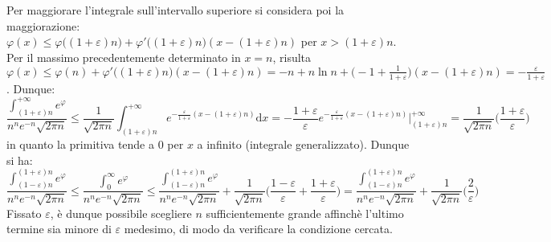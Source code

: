 \documentclass[10pt]{article}
\theoremstyle{plain}
\begin{document}
Per maggiorare l'integrale sull'intervallo superiore si considera poi la maggiorazione: 
\\$\displaystyle \varphi(x) \leq \varphi\big((1+\varepsilon)n\big) + \varphi'\big((1+\varepsilon)n\big)( x - (1+\varepsilon) n)$ per $x > (1+\varepsilon) n$. Per il massimo precedentemente determinato in $x = n$, risulta $\displaystyle \varphi(x) \leq \varphi(n) + \varphi'\big((1+\varepsilon)n\big)( x - (1+\varepsilon) n) = - n + n \ln n + \big( - 1 + \frac{1}{1+\varepsilon}\big) (x - (1+\varepsilon) n) = -\frac{\varepsilon}{1+\varepsilon}$. Dunque:
\[\frac{\displaystyle \int_{(1 + \varepsilon) n}^{+\infty} e^\varphi}{n^n e^{-n} \sqrt{2\pi n}} \leq \frac{1}{\sqrt{2\pi n}}\int_{(1 + \varepsilon) n}^{+\infty} e^{\displaystyle - \frac{\varepsilon}{1+\varepsilon}(x - (1+\varepsilon) n)}\textrm{d}x = - \frac{1+\varepsilon}{\varepsilon} e^{\displaystyle - \frac{\varepsilon}{1+\varepsilon}(x - (1+\varepsilon) n)}\bigg|_{(1+\varepsilon)n}^{+\infty} = \frac{1}{\sqrt{2\pi n}} \big(\frac{1+\varepsilon}{\varepsilon}\big)\]
in quanto la primitiva tende a 0 per $x$ a infinito (integrale generalizzato). Dunque si ha:
\[\frac{\displaystyle \int_{(1 - \varepsilon) n}^{(1+\varepsilon)n} e^\varphi}{n^n e^{-n} \sqrt{2\pi n}} \leq \frac{\displaystyle \int_{0}^{\infty} e^\varphi}{n^n e^{-n} \sqrt{2\pi n}} \leq \frac{\displaystyle \int_{(1 - \varepsilon) n}^{(1+\varepsilon)n} e^\varphi}{n^n e^{-n} \sqrt{2\pi n}} + \frac{1}{\sqrt{2\pi n}}\big(\frac{1-\varepsilon}{\varepsilon} + \frac{1+\varepsilon}{\varepsilon}\big) = \frac{\displaystyle \int_{(1 - \varepsilon) n}^{(1+\varepsilon)n} e^\varphi}{n^n e^{-n} \sqrt{2\pi n}} + \frac{1}{\sqrt{2\pi n}}\big(\frac{2}{\varepsilon}\big)\]
Fissato $\varepsilon$, è dunque possibile scegliere $n$ sufficientemente grande affinchè l'ultimo termine sia minore di $\varepsilon$ medesimo, di modo da verificare la condizione cercata.
\end{document}
